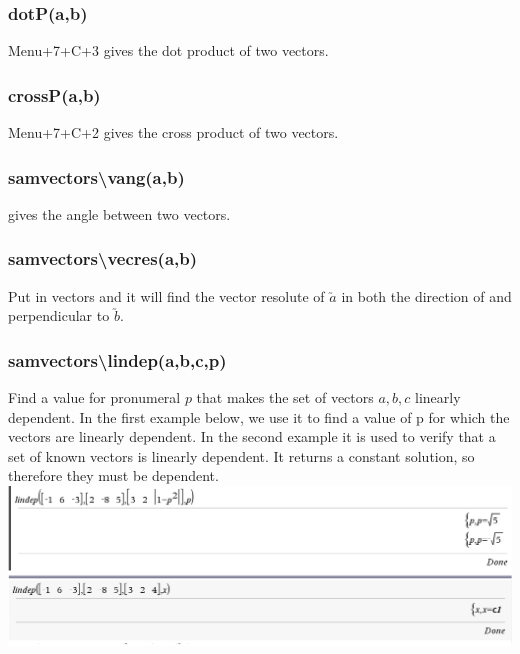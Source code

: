 \documentclass[a4paper,twoside]{article}
\begin{document}
			\subsubsection{dotP(a,b)} Menu+7+C+3 gives the dot product of two vectors.
			\subsubsection{crossP(a,b)} Menu+7+C+2 gives the cross product of two vectors.
			\subsubsection{sam\textunderscore vectors\textbackslash vang(a,b)} gives the angle between two vectors.
			\subsubsection{sam\textunderscore vectors\textbackslash vecres(a,b)} Put in vectors and it will find the vector resolute of $\utilde{a}$ in both the direction of and perpendicular to $\utilde{b}$.
			\subsubsection{sam\textunderscore vectors\textbackslash lindep(a,b,c,p)} Find a value for pronumeral $p$ that makes the set of vectors $a,b,c$ linearly dependent. In the first example below, we use it to find a value of p for which the vectors are linearly dependent. In the second example it is used to verify that a set of known vectors is linearly dependent. It returns a constant solution, so therefore they must be dependent.\\
			\includegraphics[width=18cm]{lindepcas.png}
\end{document}
